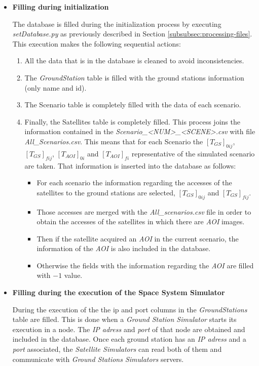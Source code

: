 \begin{itemize}

\item \textbf{Filling during initialization}

The database is filled during the initialization process by executing
\emph{setDatabase.py} as previously described in Section
\ref{subsubsec:processing-files}. This execution makes the following sequential
actions:
\begin{enumerate}
\item All the data that is in the database is cleaned to avoid inconsistencies.
\item The \emph{GroundStation} table is filled with the ground stations information (only name and id).
\item The Scenario table is completely filled with the data of each scenario.
\item Finally, the Satellites table is completely filled. This process joins the
  information contained in the \emph{Scenario\_<NUM>\_<SCENE>.csv} with file
  \emph{All\_Scenarios.csv}. This means that for each Scenario the $[T_{GS}]_{0ij}$,
  $[T_{GS}]_{fij}$,  $[T_{AOI}]_{0i}$ and $[T_{AOI}]_{fi}$ representative of the simulated
  scenario are taken. That information is inserted into the database as follows: 
\begin{itemize}
\item For each scenario the information regarding the accesses of the satellites to the ground stations are selected, $[T_{GS}]_{0ij}$ and $[T_{GS}]_{fij}$. 
\item Those accesses are merged with the \emph{All\_scenarios.csv} file in order to obtain the accesses of the satellites in which there are \emph{AOI} images. 
\item Then if the satellite acquired an \emph{AOI} in the current scenario, the information of the \emph{AOI} is also included in the database. 
\item Otherwise the fields with the information regarding the \emph{AOI} are filled
  with $-1$ value. 
\end{itemize}
\end{enumerate}

\item \textbf{Filling during the execution of the Space System Simulator}

During the execution of the \gsss the ip and port columns in the
\emph{GroundStations} table are filled. This is done when a \emph{Ground Station
  Simulator} starts its execution in a node. The \emph{IP adress} and
\emph{port} of that node are obtained and included in the database. Once each
ground station has an \emph{IP adress} and a \emph{port} associated, the \emph{Satellite Simulators} can read both of them and communicate with \emph{Ground Stations Simulators} servers.

\end{itemize}



